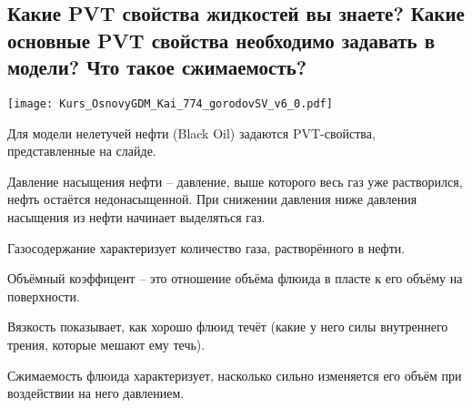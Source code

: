 

\subsection{Какие PVT свойства жидкостей вы знаете? Какие основные PVT свойства необходимо задавать в модели? Что такое сжимаемость?}

\texttt{[image: Kurs\_OsnovyGDM\_Kai\_774\_gorodovSV\_v6\_0.pdf]}

Для модели нелетучей нефти (Black Oil) задаются PVT-свойства, представленные на слайде.

Давление насыщения нефти -- давление, выше которого весь газ уже растворился, нефть остаётся недонасыщенной.
При снижении давления ниже давления насыщения из нефти начинает выделяться газ.

Газосодержание характеризует количество газа, растворённого в нефти.

Объёмный коэффицент -- это отношение объёма флюида в пласте к его объёму на поверхности.

Вязкость показывает, как хорошо флюид течёт (какие у него силы внутреннего трения, которые мешают ему течь).

Сжимаемость флюида характеризует, насколько сильно изменяется его объём при воздействии на него давлением.

